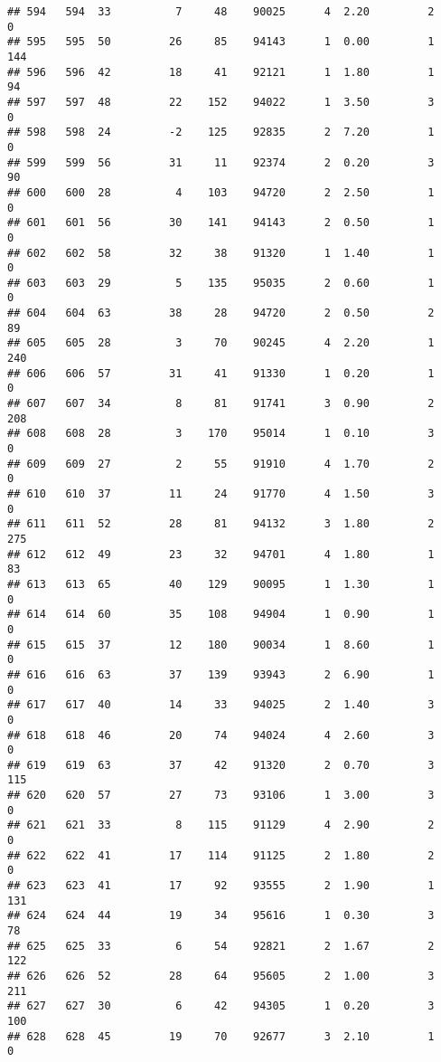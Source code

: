 \documentclass[
]{article}
\begin{document}
\begin{verbatim}
## 594   594  33          7     48    90025      4  2.20         2        0
## 595   595  50         26     85    94143      1  0.00         1      144
## 596   596  42         18     41    92121      1  1.80         1       94
## 597   597  48         22    152    94022      1  3.50         3        0
## 598   598  24         -2    125    92835      2  7.20         1        0
## 599   599  56         31     11    92374      2  0.20         3       90
## 600   600  28          4    103    94720      2  2.50         1        0
## 601   601  56         30    141    94143      2  0.50         1        0
## 602   602  58         32     38    91320      1  1.40         1        0
## 603   603  29          5    135    95035      2  0.60         1        0
## 604   604  63         38     28    94720      2  0.50         2       89
## 605   605  28          3     70    90245      4  2.20         1      240
## 606   606  57         31     41    91330      1  0.20         1        0
## 607   607  34          8     81    91741      3  0.90         2      208
## 608   608  28          3    170    95014      1  0.10         3        0
## 609   609  27          2     55    91910      4  1.70         2        0
## 610   610  37         11     24    91770      4  1.50         3        0
## 611   611  52         28     81    94132      3  1.80         2      275
## 612   612  49         23     32    94701      4  1.80         1       83
## 613   613  65         40    129    90095      1  1.30         1        0
## 614   614  60         35    108    94904      1  0.90         1        0
## 615   615  37         12    180    90034      1  8.60         1        0
## 616   616  63         37    139    93943      2  6.90         1        0
## 617   617  40         14     33    94025      2  1.40         3        0
## 618   618  46         20     74    94024      4  2.60         3        0
## 619   619  63         37     42    91320      2  0.70         3      115
## 620   620  57         27     73    93106      1  3.00         3        0
## 621   621  33          8    115    91129      4  2.90         2        0
## 622   622  41         17    114    91125      2  1.80         2        0
## 623   623  41         17     92    93555      2  1.90         1      131
## 624   624  44         19     34    95616      1  0.30         3       78
## 625   625  33          6     54    92821      2  1.67         2      122
## 626   626  52         28     64    95605      2  1.00         3      211
## 627   627  30          6     42    94305      1  0.20         3      100
## 628   628  45         19     70    92677      3  2.10         1        0

\end{verbatim}
\end{document}
